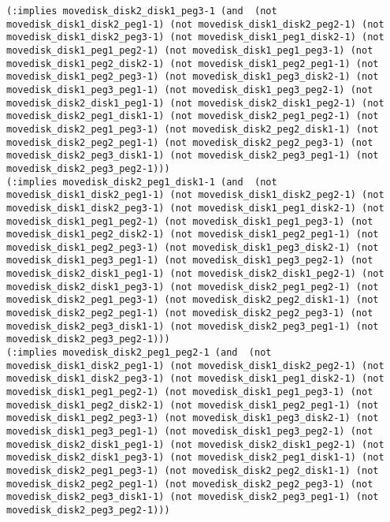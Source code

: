 \documentclass[12pt,letterpaper]{ntdhw}
\begin{document}
\begin{enumerate}
\begin{enumerate}
\begin{lstlisting}[language=pddl, style=pddlstyle,
  basicstyle=\scriptsize]
(:implies movedisk_disk2_disk1_peg3-1 (and  (not movedisk_disk1_disk2_peg1-1) (not movedisk_disk1_disk2_peg2-1) (not movedisk_disk1_disk2_peg3-1) (not movedisk_disk1_peg1_disk2-1) (not movedisk_disk1_peg1_peg2-1) (not movedisk_disk1_peg1_peg3-1) (not movedisk_disk1_peg2_disk2-1) (not movedisk_disk1_peg2_peg1-1) (not movedisk_disk1_peg2_peg3-1) (not movedisk_disk1_peg3_disk2-1) (not movedisk_disk1_peg3_peg1-1) (not movedisk_disk1_peg3_peg2-1) (not movedisk_disk2_disk1_peg1-1) (not movedisk_disk2_disk1_peg2-1) (not movedisk_disk2_peg1_disk1-1) (not movedisk_disk2_peg1_peg2-1) (not movedisk_disk2_peg1_peg3-1) (not movedisk_disk2_peg2_disk1-1) (not movedisk_disk2_peg2_peg1-1) (not movedisk_disk2_peg2_peg3-1) (not movedisk_disk2_peg3_disk1-1) (not movedisk_disk2_peg3_peg1-1) (not movedisk_disk2_peg3_peg2-1)))
(:implies movedisk_disk2_peg1_disk1-1 (and  (not movedisk_disk1_disk2_peg1-1) (not movedisk_disk1_disk2_peg2-1) (not movedisk_disk1_disk2_peg3-1) (not movedisk_disk1_peg1_disk2-1) (not movedisk_disk1_peg1_peg2-1) (not movedisk_disk1_peg1_peg3-1) (not movedisk_disk1_peg2_disk2-1) (not movedisk_disk1_peg2_peg1-1) (not movedisk_disk1_peg2_peg3-1) (not movedisk_disk1_peg3_disk2-1) (not movedisk_disk1_peg3_peg1-1) (not movedisk_disk1_peg3_peg2-1) (not movedisk_disk2_disk1_peg1-1) (not movedisk_disk2_disk1_peg2-1) (not movedisk_disk2_disk1_peg3-1) (not movedisk_disk2_peg1_peg2-1) (not movedisk_disk2_peg1_peg3-1) (not movedisk_disk2_peg2_disk1-1) (not movedisk_disk2_peg2_peg1-1) (not movedisk_disk2_peg2_peg3-1) (not movedisk_disk2_peg3_disk1-1) (not movedisk_disk2_peg3_peg1-1) (not movedisk_disk2_peg3_peg2-1)))
(:implies movedisk_disk2_peg1_peg2-1 (and  (not movedisk_disk1_disk2_peg1-1) (not movedisk_disk1_disk2_peg2-1) (not movedisk_disk1_disk2_peg3-1) (not movedisk_disk1_peg1_disk2-1) (not movedisk_disk1_peg1_peg2-1) (not movedisk_disk1_peg1_peg3-1) (not movedisk_disk1_peg2_disk2-1) (not movedisk_disk1_peg2_peg1-1) (not movedisk_disk1_peg2_peg3-1) (not movedisk_disk1_peg3_disk2-1) (not movedisk_disk1_peg3_peg1-1) (not movedisk_disk1_peg3_peg2-1) (not movedisk_disk2_disk1_peg1-1) (not movedisk_disk2_disk1_peg2-1) (not movedisk_disk2_disk1_peg3-1) (not movedisk_disk2_peg1_disk1-1) (not movedisk_disk2_peg1_peg3-1) (not movedisk_disk2_peg2_disk1-1) (not movedisk_disk2_peg2_peg1-1) (not movedisk_disk2_peg2_peg3-1) (not movedisk_disk2_peg3_disk1-1) (not movedisk_disk2_peg3_peg1-1) (not movedisk_disk2_peg3_peg2-1)))

\end{lstlisting}
\end{enumerate}
\end{enumerate}
\end{document}
